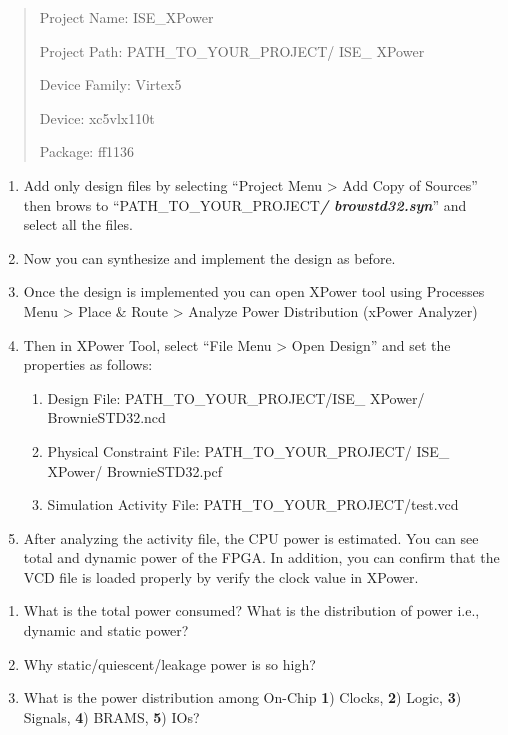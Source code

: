 \documentclass[
]{article}
\begin{document}
\begin{quote}
Project Name: ISE\_XPower

Project Path: PATH\_TO\_YOUR\_PROJECT/ ISE\_ XPower

Device Family: Virtex5

Device: xc5vlx110t

Package: ff1136
\end{quote}

\begin{enumerate}
\def\labelenumi{\arabic{enumi}.}
\setcounter{enumi}{3}
\item
  Add only design files by selecting ``Project Menu \textgreater{} Add
  Copy of Sources'' then brows to
  ``PATH\_TO\_YOUR\_PROJECT\emph{\textbf{/ browstd32.syn}}'' and select
  all the files.
\item
  Now you can synthesize and implement the design as before.
\item
  Once the design is implemented you can open XPower tool using
  Processes Menu \textgreater{} Place \& Route \textgreater{} Analyze
  Power Distribution (xPower Analyzer)
\item
  Then in XPower Tool, select ``File Menu \textgreater{} Open Design''
  and set the properties as follows:

  \begin{enumerate}
  \def\labelenumii{\arabic{enumii}.}
  \item
    Design File: PATH\_TO\_YOUR\_PROJECT/ISE\_ XPower/ ﻿BrownieSTD32.ncd
  \item
    Physical Constraint File: PATH\_TO\_YOUR\_PROJECT/ ISE\_ XPower/
    ﻿BrownieSTD32.pcf
  \item
    Simulation Activity File: PATH\_TO\_YOUR\_PROJECT/test.vcd
  \end{enumerate}
\item
  After analyzing the activity file, the CPU power is estimated. You can
  see total and dynamic power of the FPGA. In addition, you can confirm
  that the VCD file is loaded properly by verify the clock value in
  XPower.
\end{enumerate}

\begin{enumerate}
\def\labelenumi{\alph{enumi}.}
\item
  What is the total power consumed? What is the distribution of power
  i.e., dynamic and static power?
\item
  Why static/quiescent/leakage power is so high?
\item
  What is the power distribution among On-Chip \textbf{1}) Clocks,
  \textbf{2}) Logic, \textbf{3}) Signals, \textbf{4}) BRAMS, \textbf{5})
  IOs?
\end{enumerate}
\end{document}
